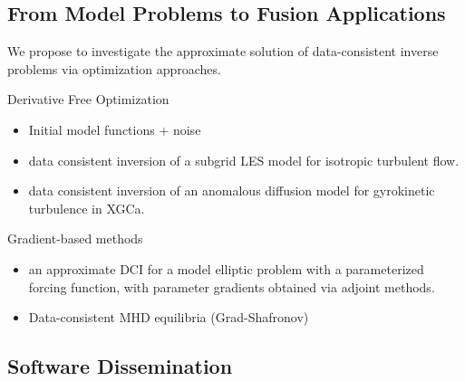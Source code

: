 \documentclass[11pt]{beamer}
\begin{document}
\subsection{From Model Problems to Fusion Applications}

\begin{frame}

We propose to investigate the approximate solution of data-consistent inverse problems via optimization approaches.

\begin{block}{Derivative Free Optimization}
\begin{itemize}
	\item Initial model functions + noise
        \item  data consistent inversion of a subgrid LES model for isotropic turbulent flow.  
        \item data consistent inversion of an anomalous diffusion model for gyrokinetic turbulence in XGCa.
        \end{itemize}
\end{block}

\begin{block}{Gradient-based methods}
\begin{itemize}
	\item an approximate DCI for a model elliptic problem with a parameterized forcing function, with parameter gradients obtained via adjoint methods.  
	\item Data-consistent MHD equilibria (Grad-Shafronov)
\end{itemize}
\end{block}


\end{frame}

\subsection{Software Dissemination}
\end{document}

